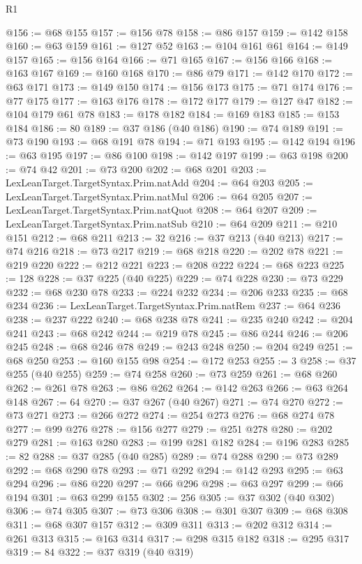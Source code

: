 \begin{lexlean}{R1}
\begin{coremodule}
@156 := @68 @155
@157 := @156 @78
@158 := @86 @157
@159 := @142 @158
@160 := @63 @159
@161 := @127 @52
@163 := @104 @161 @61
@164 := @149 @157
@165 := @156 @164
@166 := @71 @165
@167 := @156 @166
@168 := @163 @167
@169 := @160 @168
@170 := @86 @79
@171 := @142 @170
@172 := @63 @171
@173 := @149 @150
@174 := @156 @173
@175 := @71 @174
@176 := @77 @175
@177 := @163 @176
@178 := @172 @177
@179 := @127 @47
@182 := @104 @179 @61 @78
@183 := @178 @182
@184 := @169 @183
@185 := @153 @184
@186 := 80
@189 := @37 @186 (@40 @186)
@190 := @74 @189
@191 := @73 @190
@193 := @68 @191 @78
@194 := @71 @193
@195 := @142 @194
@196 := @63 @195
@197 := @86 @100
@198 := @142 @197
@199 := @63 @198
@200 := @74 @42
@201 := @73 @200
@202 := @68 @201
@203 := LexLeanTarget.TargetSyntax.Prim.natAdd
@204 := @64 @203
@205 := LexLeanTarget.TargetSyntax.Prim.natMul
@206 := @64 @205
@207 := LexLeanTarget.TargetSyntax.Prim.natQuot
@208 := @64 @207
@209 := LexLeanTarget.TargetSyntax.Prim.natSub
@210 := @64 @209
@211 := @210 @151
@212 := @68 @211
@213 := 32
@216 := @37 @213 (@40 @213)
@217 := @74 @216
@218 := @73 @217
@219 := @68 @218
@220 := @202 @78
@221 := @219 @220
@222 := @212 @221
@223 := @208 @222
@224 := @68 @223
@225 := 128
@228 := @37 @225 (@40 @225)
@229 := @74 @228
@230 := @73 @229
@232 := @68 @230 @78
@233 := @224 @232
@234 := @206 @233
@235 := @68 @234
@236 := LexLeanTarget.TargetSyntax.Prim.natRem
@237 := @64 @236
@238 := @237 @222
@240 := @68 @238 @78
@241 := @235 @240
@242 := @204 @241
@243 := @68 @242
@244 := @219 @78
@245 := @86 @244
@246 := @206 @245
@248 := @68 @246 @78
@249 := @243 @248
@250 := @204 @249
@251 := @68 @250
@253 := @160 @155 @98
@254 := @172 @253
@255 := 3
@258 := @37 @255 (@40 @255)
@259 := @74 @258
@260 := @73 @259
@261 := @68 @260
@262 := @261 @78
@263 := @86 @262
@264 := @142 @263
@266 := @63 @264 @148
@267 := 64
@270 := @37 @267 (@40 @267)
@271 := @74 @270
@272 := @73 @271
@273 := @266 @272
@274 := @254 @273
@276 := @68 @274 @78
@277 := @99 @276
@278 := @156 @277
@279 := @251 @278
@280 := @202 @279
@281 := @163 @280
@283 := @199 @281 @182
@284 := @196 @283
@285 := 82
@288 := @37 @285 (@40 @285)
@289 := @74 @288
@290 := @73 @289
@292 := @68 @290 @78
@293 := @71 @292
@294 := @142 @293
@295 := @63 @294
@296 := @86 @220
@297 := @66 @296
@298 := @63 @297
@299 := @66 @194
@301 := @63 @299 @155
@302 := 256
@305 := @37 @302 (@40 @302)
@306 := @74 @305
@307 := @73 @306
@308 := @301 @307
@309 := @68 @308
@311 := @68 @307 @157
@312 := @309 @311
@313 := @202 @312
@314 := @261 @313
@315 := @163 @314
@317 := @298 @315 @182
@318 := @295 @317
@319 := 84
@322 := @37 @319 (@40 @319)

\end{coremodule}
\end{lexlean}
